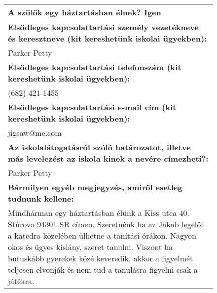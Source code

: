 \documentclass[10pt,a4paper]{article}
\begin{document}
\begin{figure}[!ht]
\begin{tabular}{|m{\textwidth}|}
\hline\vspace{3pt}
\textbf{A szülők egy háztartásban élnek? } \hspace{0.5cm} Igen \vspace{3pt} \\
\hline\vspace{3pt}
\textbf{Elsődleges kapcsolattartási személy vezetékneve és keresztneve (kit kereshetünk iskolai ügyekben):} \\ \hspace{0.5cm} Parker Petty \vspace{3pt} \\
\hline\vspace{3pt}
\textbf{Elsődleges kapcsolattartási telefonszám (kit kereshetünk iskolai ügyekben):} \\ \hspace{0.5cm} (682) 421-1455 \vspace{3pt} \\
\hline\vspace{3pt}
\textbf{Elsődleges kapcsolattartási e-mail cím (kit kereshetünk iskolai ügyekben):} \\ \hspace{0.5cm} jigsaw@me.com \vspace{3pt} \\
\hline\vspace{3pt}
\textbf{Az iskolalátogatásról szóló határozatot, illetve más levelezést az iskola kinek a nevére címezheti?:} \\ \hspace{0.5cm} Parker Petty \vspace{3pt} \\
\hline\vspace{3pt}
\textbf{Bármilyen egyéb megjegyzés, amiről esetleg tudnunk kellene:} \\ \hspace{0.5cm} Mindhárman egy háztartásban élünk a Kiss utca 40. Štúrovo 94301 SR címen.
Szeretnénk ha az Jakab legelöl a katedra közelében ülhetne a tanítási órákon. Nagyon okos és ügyes kislány, szeret tanulni. Viszont ha butuskább gyerekek közé keveredik, akkor a figyelmét teljesen elvonják és nem tud a tanulásra figyelni csak a játékra. \vspace{3pt} \\


\end{tabular}
\end{figure}
\end{document}
